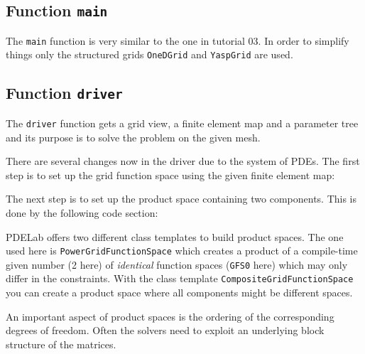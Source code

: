 \documentclass[a4paper,12pt]{article}
\begin{document}
\subsection{Function \lstinline{main}}

The \lstinline{main} function is very similar to the one in tutorial 03.
In order to simplify things only the structured grids \lstinline{OneDGrid}
and \lstinline{YaspGrid} are used.

\subsection{Function \lstinline{driver}}

The \lstinline{driver} function gets a grid view, a finite element
map and a parameter tree and its purpose is to solve the problem on
the given mesh.


There are several changes now in the driver due to the system of PDEs.
The first step is to set up the grid function space using the given finite
element map:


The next step is to set up the product space containing
two components. This is done by the following code section:

PDELab offers two different class templates to build product spaces. The
one used here is \lstinline{PowerGridFunctionSpace} which creates
a product of a compile-time given number (2 here)
of \textit{identical} function spaces (\lstinline{GFS0} here)
which may only differ in the constraints. With the
class template \lstinline{CompositeGridFunctionSpace} you can create
a product space where all components might be different spaces.

An important aspect of product spaces is the ordering of the corresponding degrees
of freedom. Often the solvers need to exploit an underlying block structure
of the matrices.
\end{document}
